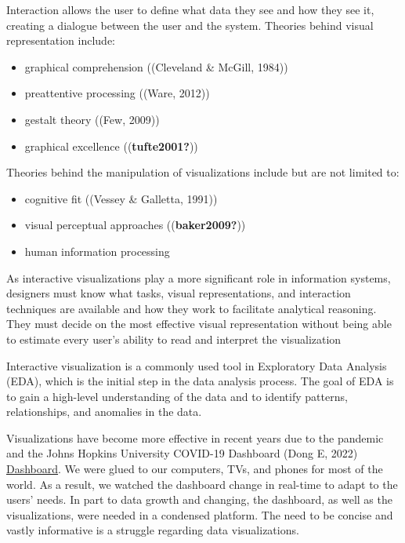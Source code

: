 \documentclass[print]{nuthesis}
\providecommand{\tightlist}{%
  \setlength{\itemsep}{0pt}\setlength{\parskip}{0pt}}
\begin{document}
Interaction allows the user to define what data they see and how they see it, creating a dialogue between the user and the system. Theories behind visual representation include:

\begin{itemize}
\tightlist
\item
  graphical comprehension ((Cleveland \& McGill, 1984))
\item
  preattentive processing ((Ware, 2012))
\item
  gestalt theory ((Few, 2009))
\item
  graphical excellence ((\textbf{tufte2001?}))
\end{itemize}

Theories behind the manipulation of visualizations include but are not limited to:

\begin{itemize}
\tightlist
\item
  cognitive fit ((Vessey \& Galletta, 1991))
\item
  visual perceptual approaches ((\textbf{baker2009?}))
\item
  human information processing
\end{itemize}

As interactive visualizations play a more significant role in information systems, designers must know what tasks, visual representations, and interaction techniques are available and how they work to facilitate analytical reasoning. They must decide on the most effective visual representation without being able to estimate every user's ability to read and interpret the visualization

Interactive visualization is a commonly used tool in Exploratory Data Analysis (EDA), which is the initial step in the data analysis process. The goal of EDA is to gain a high-level understanding of the data and to identify patterns, relationships, and anomalies in the data.

Visualizations have become more effective in recent years due to the pandemic and the Johns Hopkins University COVID-19 Dashboard (Dong E, 2022) \href{https://coronavirus.jhu.edu/map.html}{Dashboard}.
We were glued to our computers, TVs, and phones for most of the world.
As a result, we watched the dashboard change in real-time to adapt to the users' needs.
In part to data growth and changing, the dashboard, as well as the visualizations, were needed in a condensed platform.
The need to be concise and vastly informative is a struggle regarding data visualizations.
\end{document}
